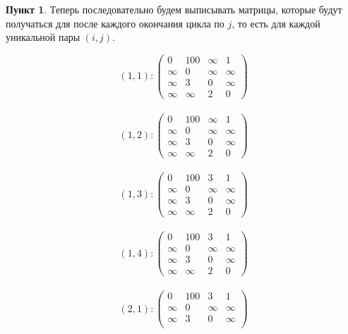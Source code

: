 \documentclass[11pt,a4paper]{scrarticle}
\theoremstyle{definition}
\newtheorem{subtask}{Пункт}
\begin{document}
\begin{subtask}
    Теперь последовательно будем выписывать матрицы, которые будут получаться для после каждого окончания цикла по $j$, то есть для каждой уникальной пары $(i, j)$.

    \begin{multicols}{2}
        $$(1, 1): \begin{pmatrix}
                0      & 100    & \infty & 1      \\
                \infty & 0      & \infty & \infty \\
                \infty & 3      & 0      & \infty \\
                \infty & \infty & 2      & 0
            \end{pmatrix}$$\\
        $$(1, 2): \begin{pmatrix}
                0      & 100    & \infty & 1      \\
                \infty & 0      & \infty & \infty \\
                \infty & 3      & 0      & \infty \\
                \infty & \infty & 2      & 0
            \end{pmatrix}$$\\
        $$(1, 3): \begin{pmatrix}
                0      & 100    & 3      & 1      \\
                \infty & 0      & \infty & \infty \\
                \infty & 3      & 0      & \infty \\
                \infty & \infty & 2      & 0
            \end{pmatrix}$$\\
        $$(1, 4): \begin{pmatrix}
                0      & 100    & 3      & 1      \\
                \infty & 0      & \infty & \infty \\
                \infty & 3      & 0      & \infty \\
                \infty & \infty & 2      & 0
            \end{pmatrix}$$\\
        $$(2, 1): \begin{pmatrix}
                0      & 100    & 3      & 1      \\
                \infty & 0      & \infty & \infty \\
                \infty & 3      & 0      & \infty \\

\end{pmatrix}$$
\end{multicols}
\end{subtask}
\end{document}
